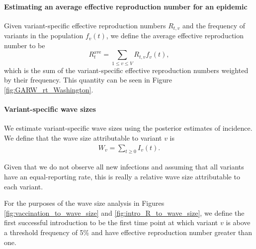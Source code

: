 \documentclass[11pt,oneside,letterpaper]{article}
\begin{document}
\paragraph{Estimating an average effective reproduction number for an epidemic}

Given variant-specific effective reproduction numbers $R_{t,v}$ and the frequency of variants in the population $f_{v}(t)$, we define the average effective reproduction number to be
\begin{equation}
  R_{t}^{\text{ave}} = \sum_{1\leq v \leq V} R_{t,v}f_{v}(t),
\end{equation}
which is the sum of the variant-specific effective reproduction numbers weighted by their frequency. This quantity can be seen in Figure \ref{fig:GARW_rt_Washington}.

\paragraph{Variant-specific wave sizes}%

We estimate variant-specific wave sizes using the posterior estimates of incidence. We define that the wave size attributable to variant $v$ is
 \begin{align*}
   W_{v} = \sum_{t \geq 0} I_{v}(t).
\end{align*}

Given that we do not observe all new infections and assuming that all variants have an equal-reporting rate, this is really a relative wave size attributable to each variant.

For the purposes of the wave size analysis in Figures \ref{fig:vaccination_to_wave_size} and \ref{fig:intro_R_to_wave_size}, we define the first successful introduction to be the first time point at which variant $v$ is above a threshold frequency of 5\% and have effective reproduction number greater than one.

\end{document}
